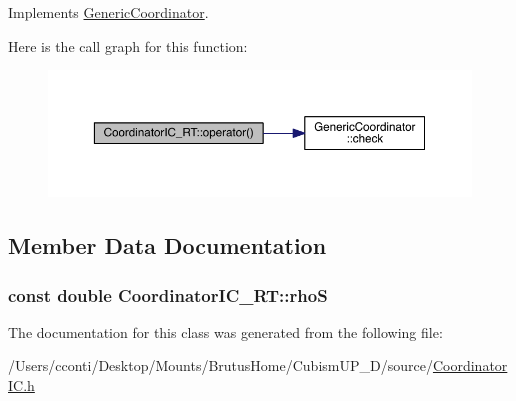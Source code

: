 Implements \hyperlink{class_generic_coordinator_a984696fef63daf7253b87ce21cce3f94}{Generic\+Coordinator}.



Here is the call graph for this function\+:\nopagebreak
\begin{figure}[H]
\begin{center}
\leavevmode
\includegraphics[width=350pt]{de/d5f/class_coordinator_i_c___r_t_a4a8653482a770c346ff8939a2f92a4af_cgraph}
\end{center}
\end{figure}




\subsection{Member Data Documentation}
\hypertarget{class_coordinator_i_c___r_t_abb42cd766cee753162f3c01009b72058}{}
\subsubsection[{rho\+S}]{\setlength{\rightskip}{0pt plus 5cm}const double Coordinator\+I\+C\+\_\+\+R\+T\+::rho\+S\hspace{0.3cm}{\ttfamily [protected]}}\label{class_coordinator_i_c___r_t_abb42cd766cee753162f3c01009b72058}


The documentation for this class was generated from the following file\+:\begin{DoxyCompactItemize}
\item 
/\+Users/cconti/\+Desktop/\+Mounts/\+Brutus\+Home/\+Cubism\+U\+P\+\_\+D/source/\hyperlink{_coordinator_i_c_8h}{Coordinator\+I\+C.\+h}\end{DoxyCompactItemize}
